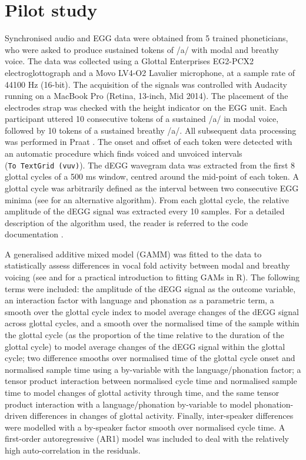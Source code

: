 \documentclass[
  11pt,
  a4paper,
]{article}
\begin{document}
\hypertarget{pilot-study}{%
\section{Pilot study}\label{pilot-study}}

\label{s:pilot}

Synchronised audio and EGG data were obtained from 5 trained
phoneticians, who were asked to produce sustained tokens of /a/ with
modal and breathy voice. The data was collected using a Glottal
Enterprises EG2-PCX2 electroglottograph and a Movo LV4-O2 Lavalier
microphone, at a sample rate of 44100 Hz (16-bit). The acquisition of
the signals was controlled with Audacity running on a MacBook Pro
(Retina, 13-inch, Mid 2014). The placement of the electrodes strap was
checked with the height indicator on the EGG unit. Each participant
uttered 10 consecutive tokens of a sustained /a/ in modal voice,
followed by 10 tokens of a sustained breathy /a/. All subsequent data
processing was performed in Praat \citep{boersma2018}. The onset and
offset of each token were detected with an automatic procedure which
finds voiced and unvoiced intervals (\texttt{To\ TextGrid\ (vuv)}). The
dEGG wavegram data was extracted from the first 8 glottal cycles of a
500 ms window, centred around the mid-point of each token. A glottal
cycle was arbitrarily defined as the interval between two consecutive
EGG minima (see \citealt{herbst2010} for an alternative algorithm). From
each glottal cycle, the relative amplitude of the dEGG signal was
extracted every 10 samples. For a detailed description of the algorithm
used, the reader is referred to the code documentation
\citep{coretta2017d}.

A generalised additive mixed model (GAMM) was fitted to the data to
statistically assess differences in vocal fold activity between modal
and breathy voicing (see \citealt{soskuthy2017} and
\citealt{wieling2018} for a practical introduction to fitting GAMs in
R). The following terms were included: the amplitude of the dEGG signal
as the outcome variable, an interaction factor with language and
phonation as a parametric term, a smooth over the glottal cycle index to
model average changes of the dEGG signal across glottal cycles, and a
smooth over the normalised time of the sample within the glottal cycle
(as the proportion of the time relative to the duration of the glottal
cycle) to model average changes of the dEGG signal within the glottal
cycle; two difference smooths over normalised time of the glottal cycle
onset and normalised sample time using a by-variable with the
language/phonation factor; a tensor product interaction between
normalised cycle time and normalised sample time to model changes of
glottal activity through time, and the same tensor product interaction
with a language/phonation by-variable to model phonation-driven
differences in changes of glottal activity. Finally, inter-speaker
differences were modelled with a by-speaker factor smooth over
normalised cycle time. A first-order autoregressive (AR1) model was
included to deal with the relatively high auto-correlation in the
residuals.
\end{document}
